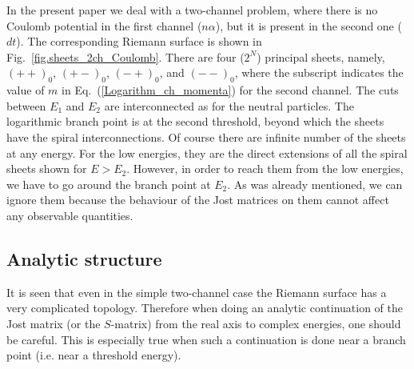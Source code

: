\documentclass[12pt]{article}
\begin{document}
In the present paper we deal with a two-channel problem, where there is no
Coulomb potential in the first channel ($n\alpha$), but it is present in the
second one ($dt$). The corresponding Riemann surface is shown in
Fig.~\ref{fig.sheets_2ch_Coulomb}.
There are four ($2^N$) principal sheets, namely, $(++)_{0}$, $(+-)_{0}$,
$(-+)_{0}$, and $(--)_{0}$, where the subscript indicates the value of $m$ in
Eq.~(\ref{Logarithm_ch_momenta}) for the second channel. The cuts between $E_1$
and $E_2$ are interconnected as for the neutral particles. The logarithmic
branch point is at
the second threshold, beyond which the sheets have the spiral interconnections.
Of course there are infinite number of the sheets at any energy. For the low
energies, they are the direct extensions of all the spiral sheets shown for
$E>E_2$. However, in order to reach them from the low energies, we have to go
around the branch point at $E_2$. As was already mentioned, we can ignore them
because the behaviour of the Jost matrices on them cannot affect any observable
quantities.

\subsection{Analytic structure}
It is seen that even in the simple two-channel case the Riemann surface has a
very complicated topology. Therefore when doing an analytic continuation of the
Jost matrix (or the $S$-matrix) from the real axis to complex energies, one
should be careful. This is especially true when such a continuation is done
near a branch point (i.e. near a threshold energy).
\end{document}
